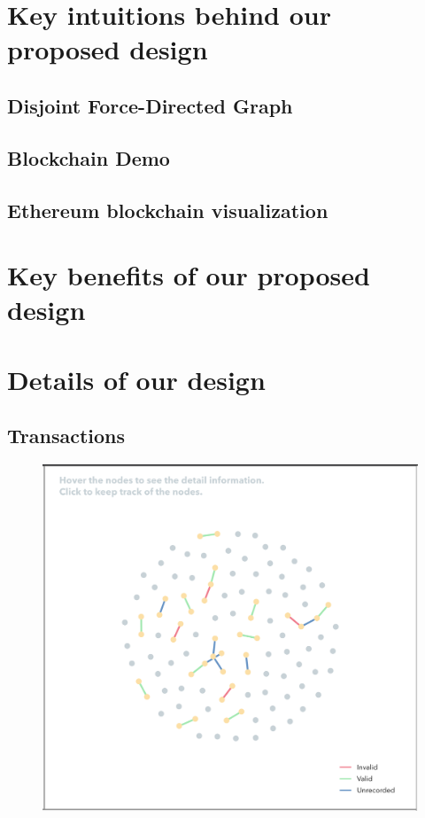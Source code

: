 \documentclass[journal, a4paper]{IEEEtran}
\begin{document}
\section{Key intuitions behind our proposed design}
\subsection{Disjoint Force-Directed Graph}
\subsection{Blockchain Demo}
\subsection{Ethereum blockchain visualization}
\section{Key benefits of our proposed design}

\section{Details of our design}
\subsection{Transactions}

\begin{figure}[!hbt]
		\begin{center}
		\includegraphics[width=\columnwidth]{transactions.png}
		\caption{}
		\label{fig:overall_design}
		\end{center}
	\end{figure}
	
\end{document}
